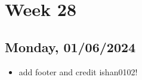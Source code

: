\newpage
\section{Week 28}

\subsection{Monday, 01/06/2024}
\begin{itemize}
    \item add footer and credit ishan0102!
\end{itemize}
